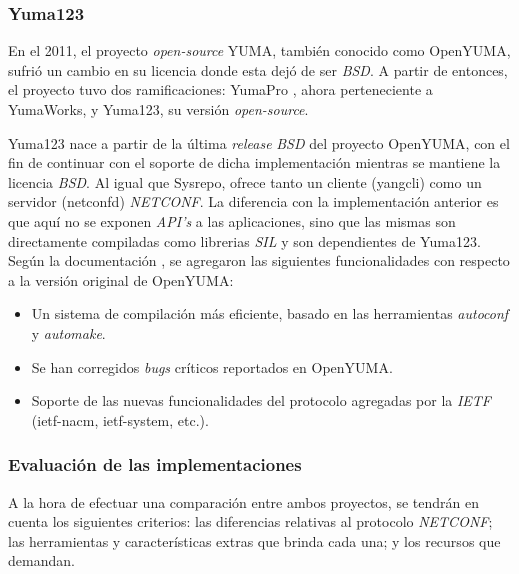 \subsubsection{Yuma123}
En el 2011, el proyecto \textit{open-source} YUMA, también conocido como OpenYUMA, sufrió un cambio en su licencia donde esta dejó de ser \textit{BSD}. A partir de entonces, el proyecto tuvo dos ramificaciones: YumaPro \parencite{yumapro}, ahora perteneciente a YumaWorks, y Yuma123, su versión \textit{open-source}. 

Yuma123 nace a partir de la última \textit{release} \textit{BSD} del proyecto OpenYUMA, con el fin de continuar con el soporte de dicha implementación mientras se mantiene la licencia \textit{BSD}. Al igual que Sysrepo, ofrece tanto un cliente (yangcli) como un servidor (netconfd) \textit{NETCONF}. La diferencia con la implementación anterior es que aquí no se exponen \textit{API’s} a las aplicaciones, sino que las mismas son directamente compiladas como librerias \textit{SIL} y son dependientes de Yuma123.
\\

Según la documentación \parencite{yuma123}, se agregaron las siguientes funcionalidades con respecto a la versión original de OpenYUMA:

\begin{itemize}
	\item Un sistema de compilación más eficiente, basado en las herramientas \textit{autoconf} y \textit{automake}.
	\item Se han corregidos \textit{bugs} críticos reportados en OpenYUMA.
	\item Soporte de las nuevas funcionalidades del protocolo agregadas por la \textit{IETF} (ietf-nacm, ietf-system, etc.). 
\end{itemize}

\subsubsection{Evaluación de las implementaciones}
A la hora de efectuar una comparación entre ambos proyectos, se tendrán en cuenta los siguientes criterios: las diferencias relativas al protocolo \textit{NETCONF}; las herramientas y características extras que brinda cada una; y los recursos que demandan.

